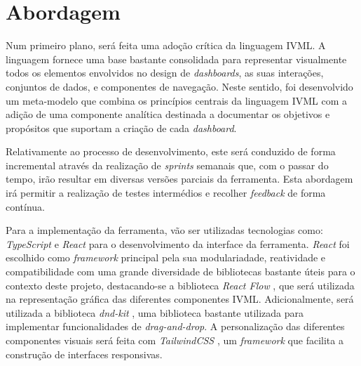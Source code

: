 
\section{Abordagem} %
\label{sec:dashboard_abordagem}

Num primeiro plano, será feita uma adoção crítica da linguagem \gls{IVML}. A linguagem fornece uma base bastante consolidada para representar visualmente todos os elementos envolvidos no design de \textit{dashboards}, as suas interações, conjuntos de dados, e componentes de navegação. Neste sentido, foi desenvolvido um meta-modelo que combina os princípios centrais da linguagem \gls{IVML} com a adição de uma componente analítica destinada a documentar os objetivos e propósitos que suportam a criação de cada \textit{dashboard}.

Relativamente ao processo de desenvolvimento, este será conduzido de forma incremental através da realização de \textit{sprints} semanais que, com o passar do tempo, irão resultar em diversas versões parciais da ferramenta. Esta abordagem irá permitir a realização de testes intermédios e recolher \textit{feedback} de forma contínua.

Para a implementação da ferramenta, vão ser utilizadas tecnologias como: \textit{TypeScript} \cite{typescript} e \textit{React} \cite{react} para o desenvolvimento da interface da ferramenta. \textit{React} foi escolhido como \textit{framework} principal pela sua modulariadade, reatividade e compatibilidade com uma grande diversidade de bibliotecas bastante úteis para o contexto deste projeto, destacando-se a biblioteca \textit{React Flow} \cite{reactflow}, que será utilizada na representação gráfica das diferentes componentes \gls{IVML}. Adicionalmente, será utilizada a biblioteca \textit{dnd-kit} \cite{dndkit}, uma biblioteca bastante utilizada para implementar funcionalidades de \textit{drag-and-drop}. A personalização das diferentes componentes visuais será feita com \textit{TailwindCSS} \cite{tailwindcss}, um \textit{framework} que facilita a construção de interfaces responsivas.

